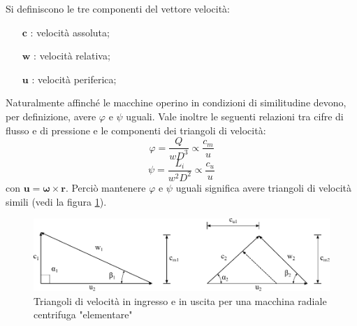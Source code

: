 Si definiscono le tre componenti del vettore velocità:
\begin{itemize}
\item[$\boldsymbol{c}$]: velocità assoluta;
\item[$\boldsymbol{w}$]: velocità relativa;
\item[$\boldsymbol{u}$]: velocità periferica;
\end{itemize}
Naturalmente affinché le macchine operino in condizioni di similitudine devono, per definizione, avere $\varphi$ e $\psi$ uguali. Vale inoltre le seguenti relazioni tra cifre di flusso e di pressione e le componenti dei triangoli di velocità:
\begin{equation}
\varphi=\frac{Q}{w D^3} \propto \frac{c_m}{u}
\end{equation}
\begin{equation}
\psi = \frac{L_i}{w^2 D^2} \propto \frac{c_u}{u}
\end{equation}
con $\boldsymbol{u}= \boldsymbol{\omega} \times \boldsymbol{r}$. Perciò mantenere $\varphi$ e $\psi$ uguali significa avere triangoli di velocità simili (vedi la figura \ref{fig:tria}).
\begin{figure}
\centering
  \includegraphics[width=.8\textwidth]{fig/triang.pdf}
\caption{Triangoli di velocità in ingresso e in uscita per una macchina radiale centrifuga "elementare"}
\label{fig:tria}
\end{figure}

